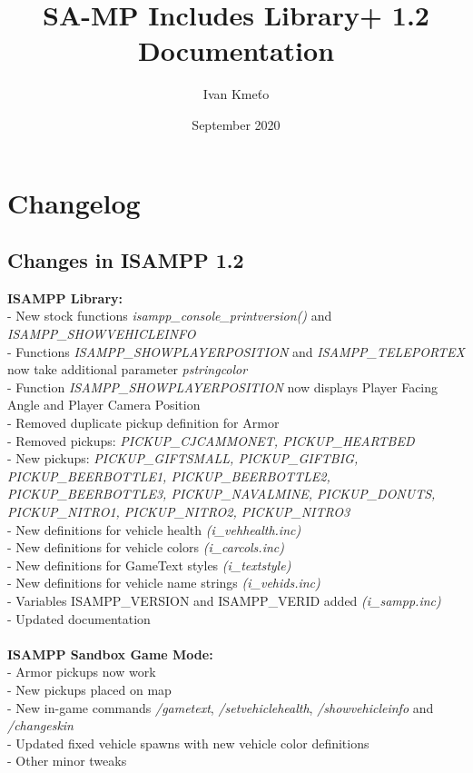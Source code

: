 \documentclass{article}
\title{SA-MP Includes Library+ 1.2 Documentation}
\author{Ivan Kmeťo}
\date{September 2020}
\begin{document}
\maketitle

\newpage
\tableofcontents

\newpage
\section{Changelog}

\subsection{Changes in ISAMPP 1.2}
\textbf{ISAMPP Library:}
\\- New stock functions \textit{isampp\_console\_printversion()} and \textit{ISAMPP\_SHOWVEHICLEINFO}
\\- Functions \textit{ISAMPP\_SHOWPLAYERPOSITION} and \textit{ISAMPP\_TELEPORTEX} now take additional parameter \textit{pstringcolor}
\\- Function \textit{ISAMPP\_SHOWPLAYERPOSITION} now displays Player Facing Angle and Player Camera Position
\\- Removed duplicate pickup definition for Armor
\\- Removed pickups: \textit{PICKUP\_CJCAMMONET, PICKUP\_HEARTBED}
\\- New pickups: \textit{PICKUP\_GIFTSMALL, PICKUP\_GIFTBIG, PICKUP\_BEERBOTTLE1, PICKUP\_BEERBOTTLE2, PICKUP\_BEERBOTTLE3, PICKUP\_NAVALMINE, PICKUP\_DONUTS, PICKUP\_NITRO1, PICKUP\_NITRO2, PICKUP\_NITRO3}
\\- New definitions for vehicle health \textit{(i\_vehhealth.inc)}
\\- New definitions for vehicle colors \textit{(i\_carcols.inc)}
\\- New definitions for GameText styles \textit{(i\_textstyle)}
\\- New definitions for vehicle name strings \textit{(i\_vehids.inc)}
\\- Variables ISAMPP\_VERSION and ISAMPP\_VERID added \textit{(i\_sampp.inc)}
\\- Updated documentation
\\
\\
\textbf{ISAMPP Sandbox Game Mode:}
\\- Armor pickups now work
\\- New pickups placed on map
\\- New in-game commands \textit{/gametext}, \textit{/setvehiclehealth}, \textit{/showvehicleinfo} and \textit{/changeskin}
\\- Updated fixed vehicle spawns with new vehicle color definitions
\\- Other minor tweaks
\end{document}
